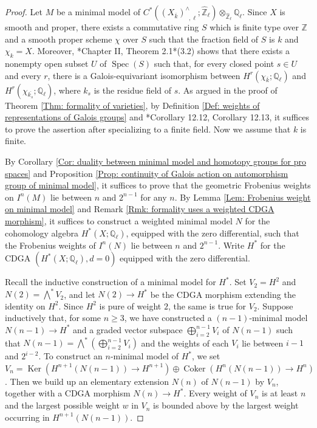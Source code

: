 \documentclass[11pt]{amsart}
\theoremstyle{definition}
\numberwithin{equation}{section}
\numberwithin{equation}{section}
\newcommand\QQ{\mathbb{Q}}
\newcommand\ZZ{\mathbb{Z}}
\DeclareMathOperator{\Ker}{Ker}
\DeclareMathOperator{\Coker}{Coker}
\DeclareMathOperator{\et}{\acute{e}t}
\DeclareMathOperator{\Spec}{Spec}
\begin{document}
\begin{proof}
Let $M$ be a minimal model of $C^*((X_{\overline{k}})^{\wedge}_{\et,\ell};\widehat{\ZZ}_{\ell})\otimes_{\widehat{\ZZ}_{\ell}}\QQ_{\ell}$. Since $X$ is smooth and proper, there exists a commutative ring $S$ which is finite type over $\ZZ$ and a smooth proper scheme $\chi$ over $S$ such that the fraction field of $S$ is $k$ and $\chi_{k}=X$. Moreover, \cite{Gros-Suwa}*{Chapter II, Theorem 2.1}\cite{Jannsen-weights}*{(3.2)} shows that there exists a nonempty open subset $U$ of $\Spec(S)$ such that, for every closed point $s\in U$ and every $r$, there is a Galois-equivariant isomorphism between $H^r_{\et}(\chi_{\overline{k}};\QQ_{\ell})$ and  $H^r_{\et}(\chi_{\overline{k_s}};\QQ_{\ell})$, where $k_s$ is the residue field of $s$. As argued in the proof of Theorem \ref{Thm: formality of varieties}, by Definition \ref{Def: weights of representations of Galois groups} and \cite{Artin-Mazur-etale-homotopy}*{Corollary 12.12, Corollary 12.13}, it suffices to prove the assertion after specializing to a finite field. Now we assume that $k$ is finite.

By Corollary \ref{Cor: duality between minimal model and homotopy groups for pro spaces} and Proposition \ref{Prop: continuity of Galois action on automorphism group of minimal model}, it suffices to prove that the geometric Frobenius weights on $I^{n}(M)$ lie between $n$ and $2^{n-1}$ for any $n$. By Lemma \ref{Lem: Frobenius weight on minimal model} and Remark \ref{Rmk: formality uses a weighted CDGA morphism}, it suffices to construct a weighted minimal model $N$ for the cohomology algebra $H^*_{\et}(X;\QQ_{\ell})$, equipped with the zero differential, such that the Frobenius weights of $I^n(N)$ lie between $n$ and $2^{n-1}$. Write $H^* $ for the CDGA $(H^*_{\et}(X;\QQ_{\ell}),d=0)$ equipped with the zero differential.

Recall the inductive construction of a minimal model for $H^*$. Set $V_2=H^2$ and $N(2)=\bigwedge^* V_2$, and let $N(2)\rightarrow H^*$ be the CDGA morphism extending the identity on $H^2$. Since $H^2$ is pure of weight $2$, the same is true for $V_2$. Suppose inductively that, for some $n\geq 3$, we have constructed a $(n-1)$-minimal model $N(n-1)\rightarrow H^*$ and a graded vector subspace $\bigoplus_{i=2}^{n-1} V_{i}$ of $N(n-1)$ such that $N(n-1)=\bigwedge^* (\bigoplus_{i=2}^{n-1} V_{i})$ and the weights of each $V_i$ lie between $i-1$ and $2^{i-2}$. To construct an $n$-minimal model of $H^*$, we set $V_n=\Ker(H^{n+1}(N(n-1))\rightarrow H^{n+1})\oplus  \Coker(H^{n}(N(n-1))\rightarrow H^{n})$. Then we build up an elementary extension $N(n)$ of $N(n-1)$ by $V_n$, together with a CDGA morphism $N(n)\rightarrow H^*$. Every weight of $V_n$ is at least $n$ and the largest possible weight $w$ in $V_n$ is bounded above by the largest weight occurring in $H^{n+1}(N(n-1))$. 


\end{proof}
\end{document}
